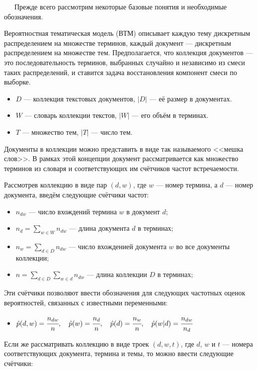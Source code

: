
$\quad\;\:$Прежде всего рассмотрим некоторые базовые понятия и необходимые обозначения.

Вероятностная тематическая модель (ВТМ) описывает каждую тему дискретным распределением на множестве терминов, каждый документ --- дискретным распределением на множестве тем. Предполагается, что коллекция документов --- это последовательность терминов, выбранных случайно и независимо из смеси таких распределений, и ставится задача восстановления компонент смеси по выборке.

\begin{itemize}
	\item $D$ --- коллекция текстовых документов, $|D|$ --- её размер в документах.
	\item $W$ --- словарь коллекции текстов, $|W|$ --- его объём в терминах.
	\item $T$ --- множество тем, $|T|$ --- число тем.
\end{itemize}

Документы в коллекции можно представить в виде так называемого <<мешка слов>>. В рамках этой концепции документ рассматривается как множество терминов из словаря и соответствующих им счётчиков частот встречаемости.

Рассмотрев коллекцию в виде пар $(d, w)$, где $w$ --- номер термина, а $d$ --- номер документа, введём следующие счётчики частот:

\begin{itemize}
	\item $n_{dw}$ --- число вхождений термина $w$ в документ $d$;
	\item $n_d = \sum_{w \in W} n_{dw}$ --- длина документа $d$ в терминах;
	\item $n_w = \sum_{d \in D} n_{dw}$ --- число вхожденией документа $w$ во все документы коллекции;
	\item $n = \sum_{d \in D}\sum_{w \in d} n_{dw}$ --- длина коллекции $D$ в терминах; 
\end{itemize}

Эти счётчики позволяют ввести обозначения для следующих частотных оценок вероятностей, связанных с известными переменными:

\begin{itemize}
\item $\hat p(d,w) = \cfrac{n_{dw}}{n}, \quad
	\hat p(w) = \cfrac{n_d}{n}, \quad
	\hat p(d) = \cfrac{n_w}{n}, \quad
	\hat p(w|d) = \cfrac{n_{dw}}{n_d}$
\end{itemize}

Если же рассматривать коллекцию в виде троек $(d, w, t)$, где $d$, $w$ и $t$ --- номера соответствующих документа, термина и темы, то можно ввести следующие счётчики: 

